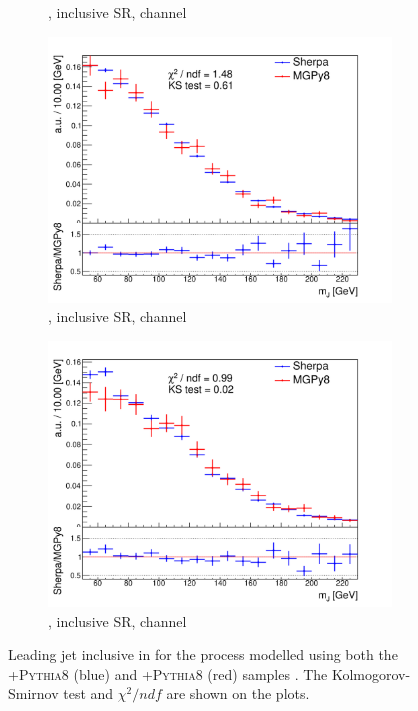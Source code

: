 \begin{figure}[!htbp]
\begin{subfigure}{.5\textwidth}
    \caption{\Whf, \pTV inclusive SR, \olep channel}
    \label{fig:Vjets_MGSherpa_inc_sub2}
  \end{subfigure}
  \begin{subfigure}{.5\textwidth}
    \includegraphics[width=\textwidth]{chapters/6.vhbb_boosted/figs/0L_Zhf_2tag1pfat0pjet_ptvinc_SR_noaddbjetsr_mJIncl.pdf}
    \caption{\Zhf, \pTV inclusive SR, \zlep channel}
    \label{fig:Vjets_MGSherpa_inc_sub3}
  \end{subfigure}%
  \hfill
  \begin{subfigure}{.5\textwidth}
    \includegraphics[width=\textwidth]{chapters/6.vhbb_boosted/figs/2L_Zhf_2tag1pfat0pjet_ptvinc_SR_mJIncl.pdf}
    \caption{\Zhf, \pTV inclusive SR, \tlep channel}
    \label{fig:Vjets_MGSherpa_inc_sub4}
  \end{subfigure}%
  \hfill
  \caption{Leading \largeR jet \mJ inclusive in \ptv for the \Vhf process modelled using both the \SHERPA+\textsc{Pythia8} (blue) and \MADGRAPH+\textsc{Pythia8} (red) samples \cite{Dao:2688371}.
  The Kolmogorov-Smirnov test and $\chi^2/ndf$ are shown on the plots.}
  \label{fig:Vjets_MGSherpa_inc}
\end{figure}



